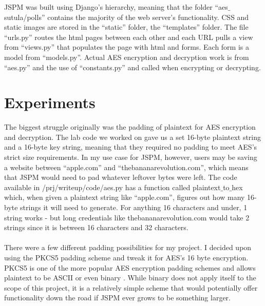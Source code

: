 JSPM was built using Django’s hierarchy, meaning that the folder “aes${\_}$sutula/polls” contains the majority of the web server’s functionality. CSS and static images are stored in the “static” folder, the “templates” folder. The file “urls.py” routes the html pages between each other and each URL pulls a view from “views.py” that populates the page with html and forms. Each form is a model from “models.py”. Actual AES encryption and decryption work is from “aes.py” and the use of “constants.py” and called when encrypting or decrypting. 


\section{Experiments}
The biggest struggle originally was the padding of plaintext for AES encryption and decryption. The lab code we worked on gave us a set 16-byte plaintext string and a 16-byte key string, meaning that they required no padding to meet AES’s strict size requirements. In my use case for JSPM, however, users may be saving a website between “apple.com” and “thebananarevolution.com”, which means that JSPM would need to pad whatever leftover bytes were left. The code available in /prj/writeup/code/aes.py has a function called plaintext${\_}$to${\_}$hex which, when given a plaintext string like “apple.com”, figures out how many 16-byte strings it will need to generate. For anything 16 characters and under, 1 string works - but long credentials like thebananarevolution.com would take 2 strings since it is between 16 characters and 32 characters. \\\\
There were a few different padding possibilities for my project. I decided upon using the PKCS5 padding scheme and tweak it for AES’s 16 byte encryption. PKCS5 is one of the more popular AES encryption padding schemes and allows plaintext to be ASCII or even binary \cite{sanober2021blockchain}. While binary does not apply itself to the scope of this project, it is a relatively simple scheme that would potentially offer functionality down the road if JSPM ever grows to be something larger.

